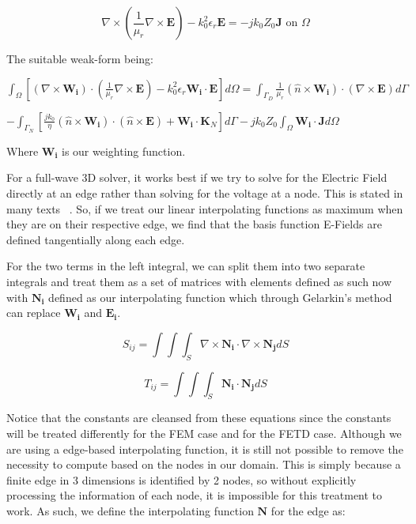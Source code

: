 \documentclass[11pt,a4paper,oldfontcommands]{memoir}
\begin{document}
\begin{equation} \label{eq:3}
\nabla\times (\frac{1}{\mu_r}\nabla \times \mathbf{E}) - k_{0}^{2}\epsilon_{r}\mathbf{E} = -jk_{0}Z_{0}\mathbf{J} \textrm{ on } \Omega
\end{equation}

The suitable weak-form being:

$\int_{\Omega}[(\nabla\times \mathbf{W_i}) \cdot (\frac{1}{\mu_r}\nabla \times \mathbf{E}) - k_{0}^{2}\epsilon_{r}\mathbf{W_i}\cdot\mathbf{E}]d\Omega = \int_{\Gamma_{D}} \frac{1}{\mu_r}(\hat{n}\times \mathbf{W_i})\cdot(\nabla \times \mathbf{E})d\Gamma$ 

$-  \int_{\Gamma_{N}}[\frac{jk_0}{\eta}(\hat{n} \times \mathbf{W_i})\cdot(\hat{n}\times\mathbf{E}) + \mathbf{W_i} \cdot \mathbf{K}_N] d\Gamma - jk_0 Z_0 \int_{\Omega}\mathbf{W_i}\cdot \mathbf{J} d\Omega$


Where $\mathbf{W_i}$ is our weighting function.

For a full-wave 3D solver, it works best if we try to solve for the Electric Field directly at an edge rather than solving for the voltage at a node. This is stated in many texts ~\cite{Jin}.  So, if we treat our linear interpolating functions as maximum when they are on their respective edge, we find that the basis function E-Fields are defined tangentially along each edge.  

For the two terms in the left integral, we can split them into two separate integrals and treat them as a set of matrices with elements defined as such now with $\mathbf{N_i}$ defined as our interpolating function which through Gelarkin's method can replace $\mathbf{W_i}$ and $\mathbf{E_i}$. 

\begin{equation} \label{eq:4}
S_{ij} = \int \int \int_{S} \nabla\times\mathbf{N_i} \cdot \nabla\times\mathbf{N_j} dS
\end{equation}

\begin{equation} \label{eq:5}
T_{ij} = \int \int \int_{S} \mathbf{N_i} \cdot \mathbf{N_j} dS
\end{equation}

Notice that the constants are cleansed from these equations since the constants will be treated differently for the FEM case and for the FETD case. Although we are using a edge-based interpolating function, it is still not possible to remove the necessity to compute based on the nodes in our domain. This is simply because a finite edge in 3 dimensions is identified by 2 nodes, so without explicitly processing the information of each node, it is impossible for this treatment to work. As such, we define the interpolating function $\mathbf{N}$ for the edge as:
\end{document}
